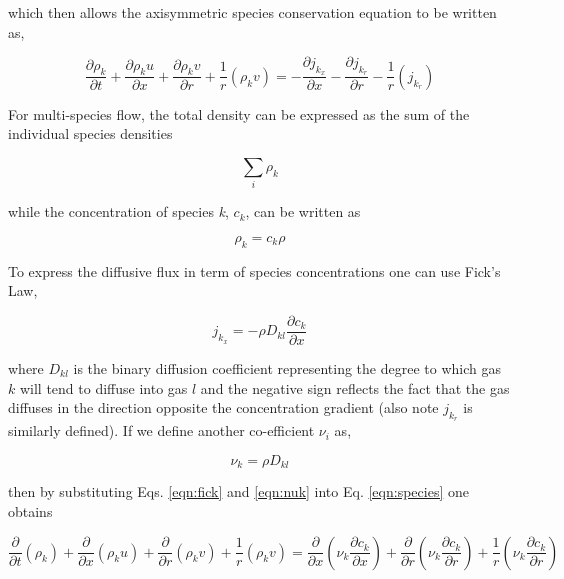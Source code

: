 	which then allows the axisymmetric species conservation equation to be written as,

\begin{equation}
	\frac{\partial \rho_k}{\partial t} + \frac{\partial \rho_k u}{\partial x} + \frac{\partial \rho_k v}{\partial r}
	+ \frac {1}{r}(\rho_k v) = -\frac{\partial j_{k_x}}{\partial x} - \frac{\partial j_{k_r}}{\partial r} - \frac {1}{r}
	(j_{k_r})
\label{eqn:species}
\end{equation}

	For multi-species flow, the total density can be expressed as the sum of the individual species densities

\begin{equation}
	\sum_{i} \rho_k
\end{equation}

	while the concentration of species \emph{k}, $c_k$, can be written as 

\begin{equation}
	\rho_k = c_k \rho
\label{eqn:conc}
\end{equation}

	To express the diffusive flux in term of species concentrations one can use Fick's Law,

\begin{equation}
	j_{k_x} = - \rho D_{kl} \frac{\partial c_k}{\partial x}
\label{eqn:fick}
\end{equation}

	where $D_{kl}$ is the binary diffusion coefficient representing the degree to which gas $k$ will tend to 
diffuse into gas $l$ and the negative sign reflects the fact that the gas diffuses in the direction opposite the
concentration gradient (also note $j_{k_r}$ is similarly defined).  If we define another co-efficient $\nu_i$ as,

\begin{equation}
	\nu_k = \rho D_{kl}
\label{eqn:nuk}
\end{equation}

	then by substituting Eqs. \ref{eqn:fick} and \ref{eqn:nuk} into Eq. \ref{eqn:species} one obtains 

\begin{equation}
	\frac{\partial}{\partial t}(\rho_k) + \frac{\partial}{\partial x}(\rho_k u) + \frac{\partial}{\partial r}(\rho_k v)
	+ \frac {1}{r}(\rho_k v) = \frac{\partial}{\partial x}(\nu_k \frac{\partial c_k}{\partial x}) + \frac{\partial}
	{\partial r}(\nu_k \frac{\partial c_k}{\partial r}) + \frac {1}{r}(\nu_k \frac{\partial c_k}{\partial r})
\label{eqn:speciesfinal}
\end{equation}


